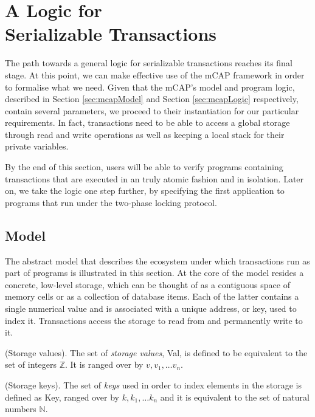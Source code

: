 \chapter[A Logic for Serializable Transactions]{A Logic for \\ Serializable Transactions}

\label{sec:transLogic}

The path towards a general logic for serializable transactions reaches its final stage. At this point, we can make effective use of the mCAP framework in order to formalise what we need.
Given that the mCAP's model and program logic, described in Section \ref{sec:mcapModel} and Section \ref{sec:mcapLogic} respectively, contain several parameters, we proceed to their instantiation for our particular requirements. In fact, transactions need to be able to access a global storage through read and write operations as well as keeping a local stack for their private variables.

By the end of this section, users will be able to verify programs containing transactions that are executed in an truly atomic fashion and in isolation. Later on, we take the logic one step further, by specifying the first application to programs that run under the two-phase locking protocol.

\section{Model}

\label{sec:transLogicMod}

The abstract model that describes the ecosystem under which transactions run as part of programs is illustrated in this section. At the core of the model resides a concrete, low-level storage, which can be thought of as a contiguous space of memory cells or as a collection of database items. Each of the latter contains a single numerical value and is associated with a unique address, or key, used to index it. Transactions access the storage to read from and permanently write to it.

\begin{defn}
	(Storage values).
	The set of \emph{storage values}, \textsf{Val}, is defined to be equivalent to the set of integers $\mathds{Z}$. It is ranged over by $v, v_1, \ldots v_n$.
\end{defn}

\begin{defn}
	(Storage keys).
	The set of \emph{keys} used in order to index elements in the storage is defined as \textsf{Key}, ranged over by $k, k_1, \ldots k_n$ and it is equivalent to the set of natural numbers $\mathds{N}$.
\end{defn}

